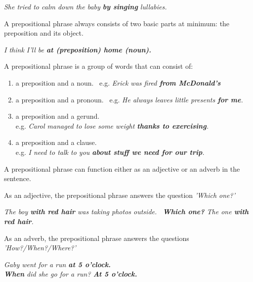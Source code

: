 \documentclass[hidelinks,10pt,a4paper]{article}
\begin{document}
\begin{center}
	\textit{She tried to calm down the baby \textbf{by singing} lullabies.}
\end{center}

A prepositional phrase always consists of two basic parts at minimum: the preposition and its object.

\begin{center}
	\textit{I think I'll be \textbf{at (preposition) home (noun).} }
\end{center}

A prepositional phrase is a group of words that can consist of:
\begin{enumerate}[label=(\alph*)]
	\item a preposition and a noun. \
		e.g. \textit{Erick was fired \textbf{from McDonald's} }
	\item a preposition and a pronoun. \
		e.g. \textit{He always leaves little presents \textbf{for me}. }
	\item a preposition and a gerund. \\
		e.g. \textit{Carol managed to lose some weight \textbf{thanks to exercising}. }
	\item a preposition and a clause. \\
		e.g. \textit{I need to talk to you \textbf{about stuff we need for our trip}. }
\end{enumerate}

A prepositional phrase can function either as an adjective or an adverb in the sentence.

As an adjective, the prepositional phrase answers the question \textit{'Which one?'}

\begin{center}
	\textit{The boy \textbf{with red hair} was taking photos outside. \
	\textbf{Which one?} The one \textbf{with red hair}.  }
\end{center}

As an adverb, the prepositional phrase answers the questions \textit{'How?/When?/Where?'}

\begin{center}
	\textit{Gaby went for a run \textbf{at 5 o'clock.}\\
	\textbf{When} did she go for a run? \textbf{At 5 o'clock.} }
\end{center}
\end{document}
